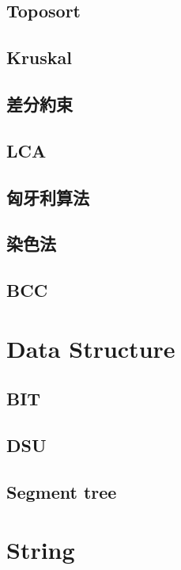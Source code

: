     \subsection{Toposort}
        
    \subsection{Kruskal}
        
    \subsection{差分約束}
        
    \subsection{LCA}
        
    \subsection{匈牙利算法}
        
    \subsection{染色法}
        
    \subsection{BCC}
        

\section{Data Structure}
    \subsection{BIT}
        
    \subsection{DSU}
        
    \subsection{Segment tree}
        

\section{String}
